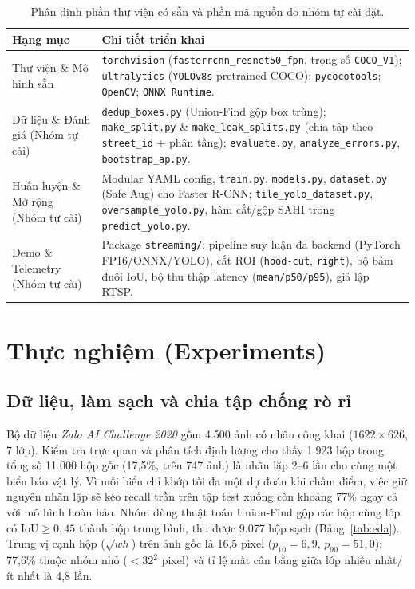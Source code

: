 \documentclass[11pt]{article}
\begin{document}
\begin{table}[t]
\centering
\small
\begin{tabular}{p{2.3cm}p{4.8cm}}
\toprule
\textbf{Hạng mục} & \textbf{Chi tiết triển khai} \\
\midrule
Thư viện \& Mô hình sẵn & \texttt{torchvision} (\texttt{fasterrcnn\_resnet50\_fpn}, trọng số \texttt{COCO\_V1}); \texttt{ultralytics} (\texttt{YOLOv8s} pretrained COCO); \texttt{pycocotools}; \texttt{OpenCV}; \texttt{ONNX Runtime}. \\
\midrule
Dữ liệu \& Đánh giá (Nhóm tự cài) & \texttt{dedup\_boxes.py} (Union-Find gộp box trùng); \texttt{make\_split.py} \& \texttt{make\_leak\_splits.py} (chia tập theo \texttt{street\_id} + phân tầng); \texttt{evaluate.py}, \texttt{analyze\_errors.py}, \texttt{bootstrap\_ap.py}. \\
\midrule
Huấn luyện \& Mở rộng (Nhóm tự cài) & Modular YAML config, \texttt{train.py}, \texttt{models.py}, \texttt{dataset.py} (Safe Aug) cho Faster R-CNN; \texttt{tile\_yolo\_dataset.py}, \texttt{oversample\_yolo.py}, hàm cắt/gộp SAHI trong \texttt{predict\_yolo.py}. \\
\midrule
Demo \& Telemetry (Nhóm tự cài) & Package \texttt{streaming/}: pipeline suy luận đa backend (PyTorch FP16/ONNX/YOLO), cắt ROI (\texttt{hood-cut}, \texttt{right}), bộ bám đuôi IoU, bộ thu thập latency (\texttt{mean/p50/p95}), giả lập RTSP. \\
\bottomrule
\end{tabular}
\caption{Phân định phần thư viện có sẵn và phần mã nguồn do nhóm tự cài đặt.}
\label{tab:impl}
\end{table}


\section{Thực nghiệm (Experiments)}

\subsection{Dữ liệu, làm sạch và chia tập chống rò rỉ}

Bộ dữ liệu \textit{Zalo AI Challenge 2020} \citep{zalo2020traffic} gồm 4.500 ảnh có nhãn công khai ($1622 \times 626$, 7 lớp). Kiểm tra trực quan và phân tích định lượng cho thấy 1.923 hộp trong tổng số 11.000 hộp gốc (17,5\%, trên 747 ảnh) là nhãn lặp 2--6 lần cho cùng một biển báo vật lý. Vì mỗi biển chỉ khớp tối đa một dự đoán khi chấm điểm, việc giữ nguyên nhãn lặp sẽ kéo recall trần trên tập test xuống còn khoảng 77\% ngay cả với mô hình hoàn hảo. Nhóm dùng thuật toán Union-Find gộp các hộp cùng lớp có $\text{IoU} \ge 0{,}45$ thành hộp trung bình, thu được 9.077 hộp sạch (Bảng~\ref{tab:eda}). Trung vị cạnh hộp ($\sqrt{wh}$) trên ảnh gốc là 16,5 pixel ($p_{10}=6{,}9$, $p_{90}=51{,}0$); 77,6\% thuộc nhóm nhỏ ($<32^2$ pixel) và tỉ lệ mất cân bằng giữa lớp nhiều nhất/ít nhất là 4,8 lần.
\end{document}
